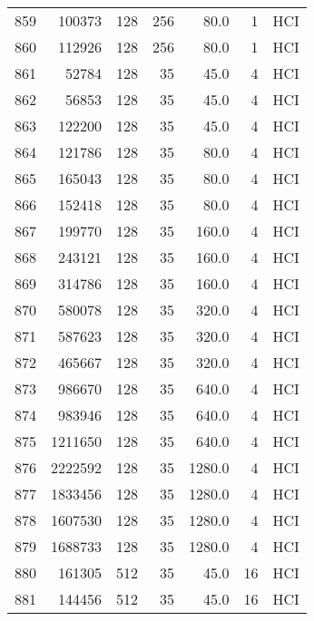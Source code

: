 \begin{longtable}{lrrrrrl}
859 &    100373 &        128 &       256 &           80.0 &       1 &  HCI \\
860 &    112926 &        128 &       256 &           80.0 &       1 &  HCI \\
861 &     52784 &        128 &        35 &           45.0 &       4 &  HCI \\
862 &     56853 &        128 &        35 &           45.0 &       4 &  HCI \\
863 &    122200 &        128 &        35 &           45.0 &       4 &  HCI \\
864 &    121786 &        128 &        35 &           80.0 &       4 &  HCI \\
865 &    165043 &        128 &        35 &           80.0 &       4 &  HCI \\
866 &    152418 &        128 &        35 &           80.0 &       4 &  HCI \\
867 &    199770 &        128 &        35 &          160.0 &       4 &  HCI \\
868 &    243121 &        128 &        35 &          160.0 &       4 &  HCI \\
869 &    314786 &        128 &        35 &          160.0 &       4 &  HCI \\
870 &    580078 &        128 &        35 &          320.0 &       4 &  HCI \\
871 &    587623 &        128 &        35 &          320.0 &       4 &  HCI \\
872 &    465667 &        128 &        35 &          320.0 &       4 &  HCI \\
873 &    986670 &        128 &        35 &          640.0 &       4 &  HCI \\
874 &    983946 &        128 &        35 &          640.0 &       4 &  HCI \\
875 &   1211650 &        128 &        35 &          640.0 &       4 &  HCI \\
876 &   2222592 &        128 &        35 &         1280.0 &       4 &  HCI \\
877 &   1833456 &        128 &        35 &         1280.0 &       4 &  HCI \\
878 &   1607530 &        128 &        35 &         1280.0 &       4 &  HCI \\
879 &   1688733 &        128 &        35 &         1280.0 &       4 &  HCI \\
880 &    161305 &        512 &        35 &           45.0 &      16 &  HCI \\
881 &    144456 &        512 &        35 &           45.0 &      16 &  HCI \\

\end{longtable}
